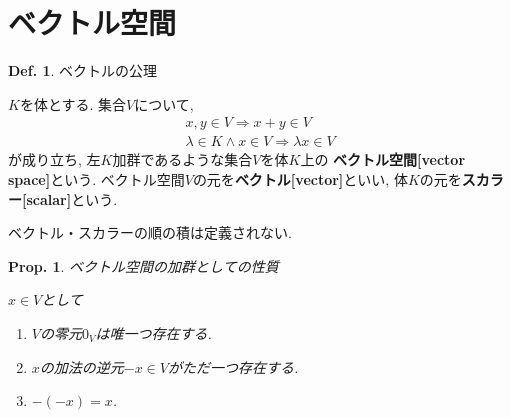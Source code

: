 \documentclass[a4paper,10pt,report]{amsart}
\theoremstyle{plain}
\newtheorem{prop}{Prop.}[section]
\theoremstyle{definition}
\newtheorem{defn}{Def.}[section]
\theoremstyle{remark}
\begin{document}
\section{ベクトル空間}
\begin{leftbar}
    \begin{defn}ベクトルの公理\par
        \(K\)を体とする. 集合\(V\)について,
        \begin{align*}
            x, y\in V\Rightarrow x+y\in V\\
            \lambda\in K\wedge x\in V\Rightarrow \lambda x\in V
        \end{align*}
        が成り立ち, 左\(K\)加群であるような集合\(V\)を体\(K\)上の
        \textbf{ベクトル空間[vector space]}という. ベクトル空間\(V\)の元を\textbf{ベクトル[vector]}といい, 
        体\(K\)の元を\textbf{スカラー[scalar]}という. 
    \end{defn}
\end{leftbar}
ベクトル・スカラーの順の積は定義されない.  
\begin{leftbar}
    \begin{prop}\label{prop::characteristics_of_a_vector_space_as_a_module}ベクトル空間の加群としての性質\par
        \(x\in V\)として
        \begin{enumerate}
            \item \(V\)の零元\(0_{V}\)は唯一つ存在する. 
            \item \(x\)の加法の逆元\(-x\in V\)がただ一つ存在する.
            \item \(-(-x)=x\). 
        \end{enumerate}
    \end{prop}
\end{leftbar}
\end{document}
